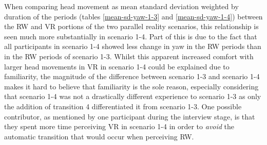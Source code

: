 When comparing head movement as mean standard deviation weighted by duration of the periods (tables \ref{mean-sd-yaw-1-3} and \ref{mean-sd-yaw-1-4}) between the RW and VR portions of the two parallel reality scenarios, this relationship is seen much more substantially in scenario 1-4. Part of this is due to the fact that all participants in scenario 1-4 showed less change in yaw in the RW periods than in the RW periods of scenario 1-3. Whilst this apparent increased comfort with larger head movements in VR in scenario 1-4 could be explained due to familiarity, the magnitude of the difference between scenario 1-3 and scenario 1-4 makes it hard to believe that familiarity is the sole reason, especially considering that scenario 1-4 was not a drastically different experience to scenario 1-3 as only the addition of transition 4 differentiated it from scenario 1-3. One possible contributor, as mentioned by one participant during the interview stage, is that they spent more time perceiving VR in scenario 1-4 in order to \textit{avoid} the automatic transition that would occur when perceiving RW.

